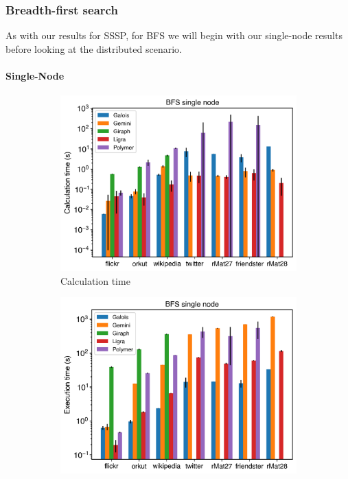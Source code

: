 
\subsubsection{Breadth-first search}
As with our results for SSSP, for BFS we will begin with our single-node results before looking at the distributed scenario.


\paragraph{Single-Node}
\begin{figure}
	\begin{subfigure}{0.32\textwidth}
		\includegraphics[width=\linewidth]{../../plots/singleNodeBFS_calcTime.png}
		\caption{Calculation time}
		\label{fig:singleNodeBFS_calc}
	\end{subfigure}
	\hfil
	\begin{subfigure}{0.32\textwidth}
		\includegraphics[width=\linewidth]{../../plots/singleNodeBFS_execTime.png}

\end{subfigure}
\end{figure}

